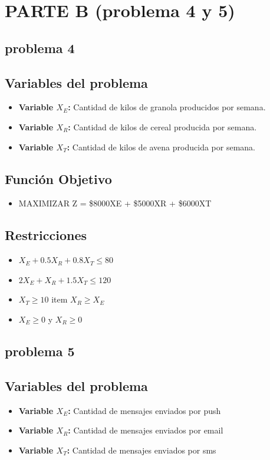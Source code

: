 \documentclass{article}
\begin{document}
\section*{PARTE B (problema 4 y 5)}

\subsection*{problema 4}
\subsection*{Variables del problema}
\begin{itemize}
    \item \textbf{Variable $X_E$:} Cantidad de kilos de granola producidos por semana.
    \item \textbf{Variable $X_R$:} Cantidad de kilos de cereal producida por semana.
    \item \textbf{Variable $X_T$:} Cantidad de kilos de avena producida por semana.
\end{itemize}

\subsection*{Función Objetivo}
\begin{itemize}
    \item MAXIMIZAR Z = \$8000XE + \$5000XR + \$6000XT
\end{itemize}

\subsection*{Restricciones}
\begin{itemize}
    \item $X_E + 0.5X_R + 0.8X_T \leq 80$ 
    \item $2X_E + X_R + 1.5X_T \leq 120$ 
    \item $X_T \geq 10$ 
    item $X_R \geq X_E$ 
    \item $X_E \geq 0$ y $X_R \geq 0$ 
\end{itemize}


\subsection*{problema 5}
\subsection*{Variables del problema}
\begin{itemize}
    \item \textbf{Variable $X_E$:} Cantidad de mensajes enviados por push
    \item \textbf{Variable $X_R$:} Cantidad de mensajes enviados por email
    \item \textbf{Variable $X_T$:} Cantidad de mensajes enviados por sms
\end{itemize}
\end{document}
